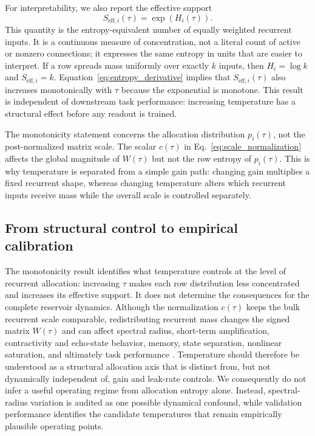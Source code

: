 \documentclass[preprint,12pt,authoryear]{elsarticle}
\begin{document}
For interpretability, we also report the effective support
\begin{equation}
  S_{\mathrm{eff},i}(\tau)=\exp(H_i(\tau)).
  \label{eq:effective_support}
\end{equation}
This quantity is the entropy-equivalent number of equally weighted recurrent inputs. It is a continuous measure of concentration, not a literal count of active or nonzero connections; it expresses the same entropy in units that are easier to interpret. If a row spreads mass uniformly over exactly $k$ inputs, then $H_i=\log k$ and $S_{\mathrm{eff},i}=k$. Equation~\ref{eq:entropy_derivative} implies that $S_{\mathrm{eff},i}(\tau)$ also increases monotonically with $\tau$ because the exponential is monotone. This result is independent of downstream task performance: increasing temperature has a structural effect before any readout is trained.

The monotonicity statement concerns the allocation distribution $p_i(\tau)$, not the post-normalized matrix scale. The scalar $c(\tau)$ in Eq.~\eqref{eq:scale_normalization} affects the global magnitude of $W(\tau)$ but not the row entropy of $p_i(\tau)$. This is why temperature is separated from a simple gain path: changing gain multiplies a fixed recurrent shape, whereas changing temperature alters which recurrent inputs receive mass while the overall scale is controlled separately.

\subsection{From structural control to empirical calibration}

The monotonicity result identifies what temperature controls at the level of recurrent allocation: increasing $\tau$ makes each row distribution less concentrated and increases its effective support. It does not determine the consequences for the complete reservoir dynamics. Although the normalization $c(\tau)$ keeps the bulk recurrent scale comparable, redistributing recurrent mass changes the signed matrix $W(\tau)$ and can affect spectral radius, short-term amplification, contractivity and echo-state behavior, memory, state separation, nonlinear saturation, and ultimately task performance \citep{jaeger2001echo,lukosevicius2009reservoir,yildiz2012revisiting}. Temperature should therefore be understood as a structural allocation axis that is distinct from, but not dynamically independent of, gain and leak-rate controls. We consequently do not infer a useful operating regime from allocation entropy alone. Instead, spectral-radius variation is audited as one possible dynamical confound, while validation performance identifies the candidate temperatures that remain empirically plausible operating points.
\end{document}

